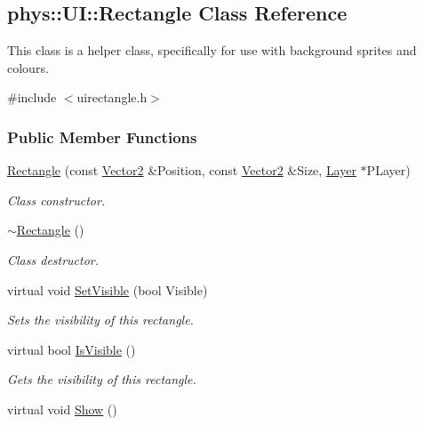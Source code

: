 \hypertarget{classphys_1_1UI_1_1Rectangle}{
\subsection{phys::UI::Rectangle Class Reference}
\label{d1/d5d/classphys_1_1UI_1_1Rectangle}
}


This class is a helper class, specifically for use with background sprites and colours.  




{\ttfamily \#include $<$uirectangle.h$>$}

\subsubsection*{Public Member Functions}
\begin{DoxyCompactItemize}
\item 
\hyperlink{classphys_1_1UI_1_1Rectangle_a845e2591ee5bd2d0a7b60debfad1cc57}{Rectangle} (const \hyperlink{classphys_1_1Vector2}{Vector2} \&Position, const \hyperlink{classphys_1_1Vector2}{Vector2} \&Size, \hyperlink{classphys_1_1UI_1_1Layer}{Layer} $\ast$PLayer)
\begin{DoxyCompactList}\small\item\em Class constructor. \item\end{DoxyCompactList}\item 
\hypertarget{classphys_1_1UI_1_1Rectangle_a8862c7e04c2b8911eac4a2d3b6aff165}{
\hyperlink{classphys_1_1UI_1_1Rectangle_a8862c7e04c2b8911eac4a2d3b6aff165}{$\sim$Rectangle} ()}
\label{d1/d5d/classphys_1_1UI_1_1Rectangle_a8862c7e04c2b8911eac4a2d3b6aff165}

\begin{DoxyCompactList}\small\item\em Class destructor. \item\end{DoxyCompactList}\item 
virtual void \hyperlink{classphys_1_1UI_1_1Rectangle_a4fa5021010e8cdaf9a9e35b3d4c82461}{SetVisible} (bool Visible)
\begin{DoxyCompactList}\small\item\em Sets the visibility of this rectangle. \item\end{DoxyCompactList}\item 
virtual bool \hyperlink{classphys_1_1UI_1_1Rectangle_aad47a2d9a7c9d8d9111b2edbf44541d5}{IsVisible} ()
\begin{DoxyCompactList}\small\item\em Gets the visibility of this rectangle. \item\end{DoxyCompactList}\item 
\hypertarget{classphys_1_1UI_1_1Rectangle_ab408c7607150b24fbc4f70870705a121}{
virtual void \hyperlink{classphys_1_1UI_1_1Rectangle_ab408c7607150b24fbc4f70870705a121}{Show} ()}
\label{d1/d5d/classphys_1_1UI_1_1Rectangle_ab408c7607150b24fbc4f70870705a121}


\end{DoxyCompactItemize}
